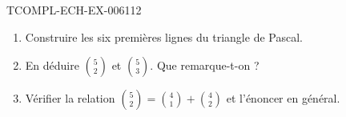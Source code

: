 \begin{exercice}{TCOMPL-ECH-EX-006}{1}{12}
\begin{enumerate}
  \item Construire les six premières lignes du triangle de Pascal.
  \item En déduire $\binom{5}{2}$ et $\binom{5}{3}$. Que remarque-t-on ?
  \item Vérifier la relation $\binom{5}{2}=\binom{4}{1}+\binom{4}{2}$ et
        l'énoncer en général.
\end{enumerate}
\end{exercice}
